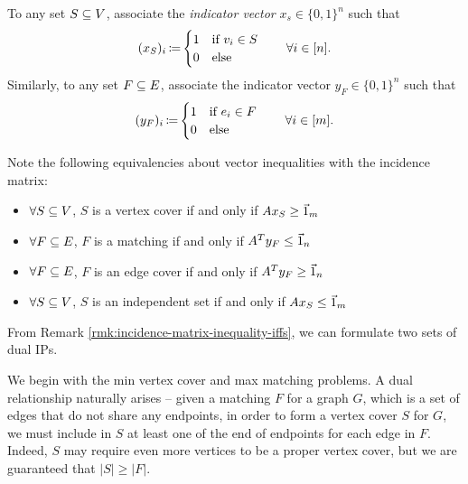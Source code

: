 \begin{defn}
    To any set $S \subseteq V$, associate the \textit{indicator vector} $x_s \in \{0,1\}^n$ such that
    \[
        (x_S)_i \operatorname*{\coloneqq} \begin{cases}
                    1 & \text{if } v_i \in S \\
                    0 & \text{else}
                  \end{cases}
        \quad \quad
        \forall i \in [n].
    \]
    Similarly, to any set $F \subseteq E$, associate the indicator vector $y_F \in \{0,1\}^n$ such that
    \[
        (y_F)_i \operatorname*{\coloneqq} \begin{cases}
                    1 & \text{if } e_i \in F \\
                    0 & \text{else}
                  \end{cases}
        \quad \quad
        \forall i \in [m].
    \]
\end{defn}

\begin{rmk}
    \label{rmk:incidence-matrix-inequality-iffs}
    Note the following equivalencies about vector inequalities with the incidence matrix:
    \begin{itemize}
        \item $\forall S \subseteq V$, $S$ is a vertex cover if and only if $A x_S \ge \Vec{1}_m$
        \item $\forall F \subseteq E$, $F$ is a matching if and only if $A^T y_F \le \Vec{1}_n$
        \item $\forall F \subseteq E$, $F$ is an edge cover if and only if $A^T y_F \ge \Vec{1}_n$
        \item $\forall S \subseteq V$, $S$ is an independent set if and only if $Ax_S \le \Vec{1}_m$
    \end{itemize}
\end{rmk}

From Remark \ref{rmk:incidence-matrix-inequality-iffs}, we can formulate two sets of dual IPs.

We begin with the min vertex cover and max matching problems. A dual relationship naturally arises -- given a matching $F$ for a graph $G$, which is a set of edges that do not share any endpoints, in order to form a vertex cover $S$ for $G$, we must include in $S$ at least one of the end of endpoints for each edge in $F$. Indeed, $S$ may require even more vertices to be a proper vertex cover, but we are guaranteed that $|S| \ge |F|$.

